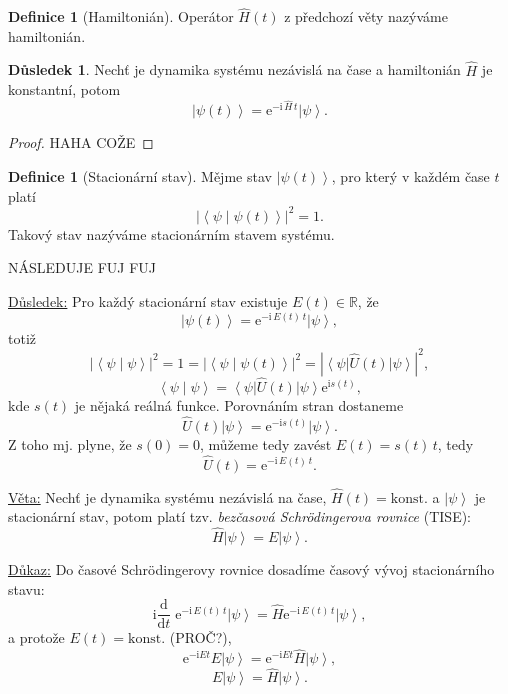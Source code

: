 \documentclass[10pt,a4paper]{article}
\theoremstyle{definition}
\newtheorem{definition}[theorem]{Definice}
\newtheorem{corollary}[theorem]{Důsledek}
\newcommand{\const}[1]{\mathrm{#1}}
\newcommand{\abs}[1]{\left| #1 \right|}
\newcommand{\dd}[2]{\frac{\const{d} #1}{\const{d} #2} \;}
\newcommand{\bra}[1]{\left< #1 \right|}
\newcommand{\ket}[1]{\left| #1 \right>}
\newcommand{\braket}[2]{\left< #1 \middle| #2 \right>}
\newcommand{\e}[1]{\const{e}^{#1}}
\renewcommand{\i}{\const{i}}
\def\R{\mathbb{R}}
\def\konst{\mathrm{konst.}}
\begin{document}
\begin{definition}[Hamiltonián]
    Operátor $\hat H(t)$ z předchozí věty nazýváme hamiltonián.
\end{definition}

\begin{corollary}
    Nechť je dynamika systému nezávislá na čase a hamiltonián $\hat H$ je konstantní, potom
    \begin{equation*}
        \ket{\psi(t)} = \e{-\i \, \hat{H} \, t} \ket{\psi}.
    \end{equation*}
\end{corollary}
\begin{proof}
    HAHA COŽE
\end{proof}

\begin{definition}[Stacionární stav]
    Mějme stav $\ket{\psi(t)}$, pro který v každém čase $t$ platí
    \begin{equation*}
        \abs{\braket{\psi}{\psi(t)}}^2 = 1.
    \end{equation*}
    Takový stav nazýváme stacionárním stavem systému.
\end{definition}

\pagebreak
NÁSLEDUJE FUJ FUJ

\vspace{2em}
\underline{Důsledek:}
Pro každý stacionární stav existuje $E(t) \in \R$, že $$\ket{\psi(t)} = \e{-\i \, E(t) \, t} \ket{\psi},$$ totiž $$\abs{\braket{\psi}{\psi}}^2 = 1 = \abs{\braket{\psi}{\psi(t)}}^2 = \abs{\bra{\psi} \hat{U}(t) \ket{\psi}}^2,$$ $$\braket{\psi}{\psi} = \bra{\psi} \hat{U}(t) \ket{\psi} \e{\i s(t)},$$
kde $s(t)$ je nějaká reálná funkce. Porovnáním stran dostaneme $$\hat{U}(t) \ket{\psi} = \e{-\i s(t)} \ket{\psi}.$$ Z toho mj. plyne, že $s(0)=0$, můžeme tedy zavést $E(t) = s(t) \, t$, tedy $$\hat{U}(t) = \e{-\i \, E(t) \, t}.$$

\vspace{2em}
\underline{Věta:}
Nechť je dynamika systému nezávislá na čase, $\hat{H}(t) = \konst$ a $\ket{\psi}$ je stacionární stav, potom platí tzv. \textit{bezčasová Schrödingerova rovnice} (TISE): $$\hat{H} \ket{\psi} = E \ket{\psi}.$$

\underline{Důkaz:}
Do časové Schrödingerovy rovnice dosadíme časový vývoj stacionárního stavu: $$\i \dd{}{t} \e{-\i \, E(t) \, t} \ket{\psi} = \hat{H} \e{-\i \, E(t) \, t} \ket{\psi},$$ a protože $E(t) = \konst$ (PROČ?), $$\e{-\i E t} E \ket{\psi} = \e{-\i E t} \hat{H} \ket{\psi},$$ $$E \ket{\psi} = \hat{H} \ket{\psi}.$$
\end{document}
